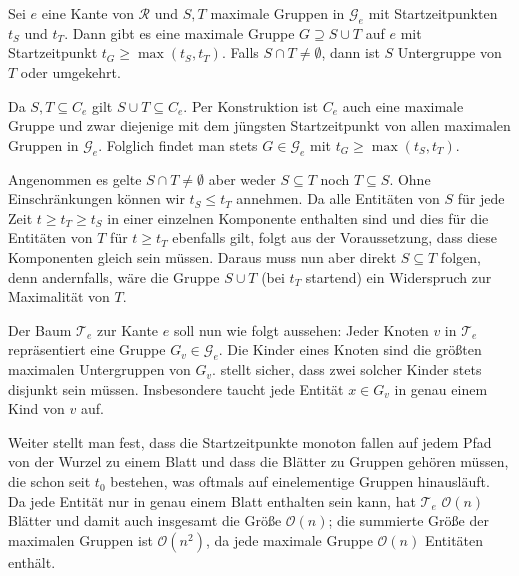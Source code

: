 \begin{lemma}[{name={\cite[Lem.~8]{buchin2015}}},label=lem:untergruppen]
	Sei $e$ eine Kante von $\mathcal{R}$ und $S,T$ maximale Gruppen in $\mathcal{G}_e$ mit Startzeitpunkten $t_S$ und $t_T$.
	Dann gibt es eine maximale Gruppe $G \supseteq S \cup T$ auf $e$ mit Startzeitpunkt $t_G \ge \max(t_S,t_T)$.
	Falls $S \cap T \neq \emptyset$, dann ist $S$ Untergruppe von $T$ oder umgekehrt.
\end{lemma}
\begin{beweis}
	Da $S,T \subseteq C_e$ gilt $S \cup T \subseteq C_e$.
	Per Konstruktion ist $C_e$ auch eine maximale Gruppe und zwar diejenige mit dem jüngsten Startzeitpunkt von allen maximalen Gruppen in $\mathcal{G}_e$.
	Folglich findet man stets $G \in \mathcal{G}_e$ mit $t_G \ge \max(t_S,t_T)$.
	
	Angenommen es gelte $S \cap T \neq \emptyset$ aber weder $S \subseteq T$ noch $T \subseteq S$.
	Ohne Einschränkungen können wir $t_S \le t_T$ annehmen.
	Da alle Entitäten von $S$ für jede Zeit $t \ge t_T \ge t_S$ in einer einzelnen Komponente enthalten sind und dies für die Entitäten von $T$ für $t \ge t_T$ ebenfalls gilt, folgt aus der Voraussetzung, dass diese Komponenten gleich sein müssen.
	Daraus muss nun aber direkt $S \subseteq T $ folgen, denn andernfalls, wäre die Gruppe $S \cup T$ (bei $t_T$ startend) ein Widerspruch zur Maximalität von $T$.
\end{beweis}

Der Baum $\mathcal{T}_e$ zur Kante $e$ soll nun wie folgt aussehen: Jeder Knoten $v$ in $\mathcal{T}_e$ repräsentiert eine Gruppe $G_v \in \mathcal{G}_e$.
Die Kinder eines Knoten sind die größten maximalen Untergruppen von $G_v$.
 stellt sicher, dass zwei solcher Kinder stets disjunkt sein müssen.
Insbesondere taucht jede Entität $x \in G_v$ in genau einem Kind von $v$ auf.

Weiter stellt man fest, dass die Startzeitpunkte monoton fallen auf jedem Pfad von der Wurzel zu einem Blatt und dass die Blätter zu Gruppen gehören müssen, die schon seit $t_0$ bestehen, was oftmals auf einelementige Gruppen hinausläuft.
Da jede Entität nur in genau einem Blatt enthalten sein kann, hat $\mathcal{T}_e$ $\mathcal{O}(n)$ Blätter und damit auch insgesamt die Größe $\mathcal{O}(n)$; die summierte Größe der maximalen Gruppen ist $\mathcal{O}(n^2)$, da jede maximale Gruppe $\mathcal{O}(n)$ Entitäten enthält.

